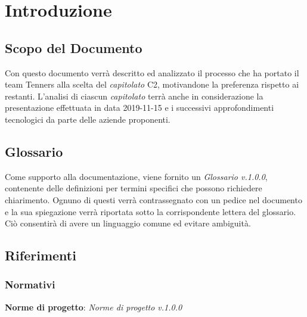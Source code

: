 \section{Introduzione}

\subsection{Scopo del Documento}
Con questo documento verrà descritto ed analizzato il processo che ha portato il team Tenners alla scelta del \textit{capitolato\glo} C2, motivandone la preferenza rispetto ai restanti. L'analisi di ciascun \textit{capitolato\glo} terrà anche in considerazione la presentazione effettuata in data 2019-11-15 e i successivi approfondimenti tecnologici da parte delle aziende proponenti.
	
\subsection{Glossario}
Come supporto alla documentazione, viene fornito un \textit{Glossario v.1.0.0}, contenente delle definizioni per termini specifici che possono richiedere chiarimento. Ognuno di questi verrà contrassegnato con un pedice \glo nel documento e la sua spiegazione verrà riportata sotto la corrispondente lettera del glossario. Ciò consentirà di avere un linguaggio comune ed evitare ambiguità. 
	
\subsection{Riferimenti}
\subsubsection{Normativi}
\textbf{Norme di progetto}: \textit{Norme di progetto v.1.0.0}


